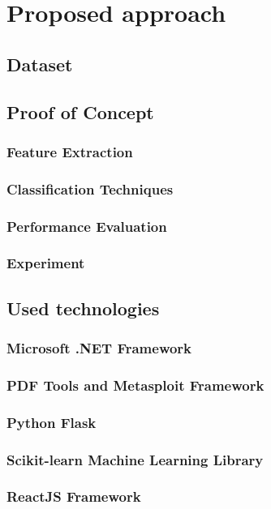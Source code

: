 \chapter{Proposed approach}
\label{chapter:proposedApproach}


\section{Dataset}
\label{section:dataset}

\section{Proof of Concept}
\label{section:poc}
\subsection{Feature Extraction}
\subsection{Classification Techniques}
\subsection{Performance Evaluation}
\subsection{Experiment}     %

\section{Used technologies}
\label{section:technologies}
\subsection{Microsoft .NET Framework}
\subsection{PDF Tools and Metasploit Framework}
\subsection{Python Flask}
\subsection{Scikit-learn Machine Learning Library}
\subsection{ReactJS Framework}
